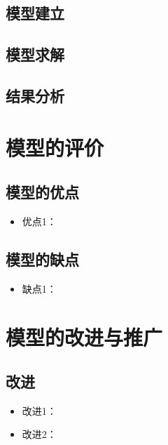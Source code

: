 \documentclass[withoutpreface,bwprint]{cumcmthesis}
\begin{document}
\subsection{模型建立}


\subsection{模型求解}

\subsection{结果分析}










\section{模型的评价}

\subsection{模型的优点}
\begin{itemize}[itemindent=2em]
\item 优点1：
\end{itemize}

\subsection{模型的缺点}
\begin{itemize}[itemindent=2em]
\item 缺点1：
\end{itemize}

\section{模型的改进与推广}

\subsection{改进}
\begin{itemize}[itemindent=2em]
   \item 改进1：
   \item 改进2：
\end{itemize}
\end{document}

